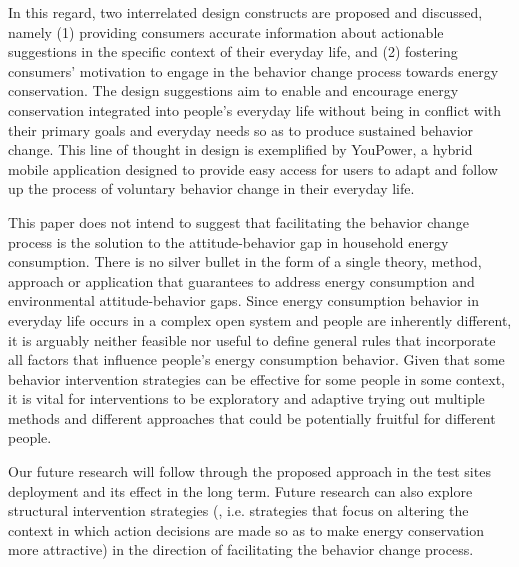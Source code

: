 \documentclass[a4paper,10pt]{article}
\begin{document}
In this regard, two interrelated design constructs are proposed and discussed, namely (1) providing consumers accurate information about actionable suggestions in the specific context of their everyday life, and (2) fostering consumers' motivation to engage in the behavior change process towards energy conservation. The design suggestions aim to enable and encourage energy conservation integrated into people's everyday life without being in conflict with their primary goals and everyday needs so as to produce sustained behavior change. This line of thought in design is exemplified by YouPower, a hybrid mobile application designed to provide easy access for users to adapt and follow up the process of voluntary behavior change in their everyday life.

This paper does not intend to suggest that facilitating the behavior change process is the solution to the attitude-behavior gap in household energy consumption. There is no silver bullet in the form of a single theory, method, approach or application that guarantees to address energy consumption and environmental attitude-behavior gaps. Since energy consumption behavior in everyday life occurs in a complex open system and people are inherently different, it is arguably neither feasible nor useful to define general rules that incorporate all factors that influence people's energy consumption behavior. Given that some behavior intervention strategies can be effective for some people in some context, it is vital for interventions to be exploratory and adaptive trying out multiple methods and different approaches that could be potentially fruitful for different people. 

Our future research will follow through the proposed approach in the test sites deployment and its effect in the long term. Future research can also explore structural intervention strategies (\cite{Steg2008}, i.e. strategies that focus on altering the context in which action decisions are made so as to make energy conservation more attractive) in the direction of facilitating the behavior change process. 

\renewcommand{\bibfont}{\small}
\printbibliography
\end{document}
